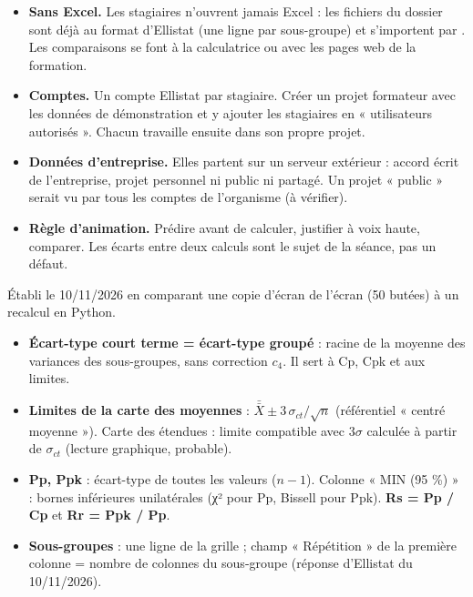 \documentclass[10pt,a4paper]{article}
\begin{document}
\thispagestyle{fancy}

\begin{itemize}
\item \textbf{Sans Excel.} Les stagiaires n'ouvrent jamais Excel : les fichiers du dossier  sont déjà au format d'Ellistat (une ligne par sous-groupe) et s'importent par . Les comparaisons se font à la calculatrice ou avec les pages web de la formation.
\item \textbf{Comptes.} Un compte Ellistat par stagiaire. Créer un projet formateur avec les données de démonstration et y ajouter les stagiaires en « utilisateurs autorisés ». Chacun travaille ensuite dans son propre projet.
\item \textbf{Données d'entreprise.} Elles partent sur un serveur extérieur : accord écrit de l'entreprise, projet personnel ni public ni partagé. Un projet « public » serait vu par tous les comptes de l'organisme (à vérifier).
\item \textbf{Règle d'animation.} Prédire avant de calculer, justifier à voix haute, comparer. Les écarts entre deux calculs sont le sujet de la séance, pas un défaut.
\end{itemize}

{\small Établi le 10/11/2026 en comparant une copie d'écran de l'écran  (50 butées) à un recalcul en Python.}
\begin{itemize}
\item \textbf{Écart-type court terme = écart-type groupé} : racine de la moyenne des variances des sous-groupes, sans correction $c_4$. Il sert à Cp, Cpk et aux limites.
\item \textbf{Limites de la carte des moyennes} : $\bar{\bar X} \pm 3\,\sigma_{ct}/\sqrt n$ (référentiel « centré moyenne »). Carte des étendues : limite compatible avec $3\sigma$ calculée à partir de $\sigma_{ct}$ (lecture graphique, probable).
\item \textbf{Pp, Ppk} : écart-type de toutes les valeurs ($n-1$). Colonne « MIN (95 \%) » : bornes inférieures unilatérales (χ² pour Pp, Bissell pour Ppk). \textbf{Rs = Pp / Cp} et \textbf{Rr = Ppk / Pp}.
\item \textbf{Sous-groupes} : une ligne de la grille ; champ « Répétition » de la première colonne = nombre de colonnes du sous-groupe (réponse d'Ellistat du 10/11/2026).
\end{itemize}
\end{document}

